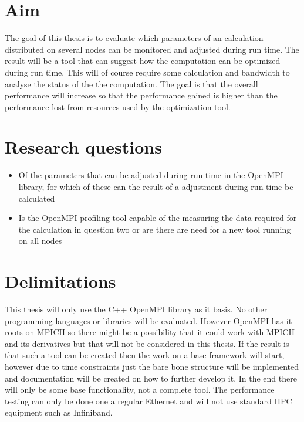 \documentclass[thesis.tex]{subfiles}
\begin{document}
\section{Aim}
The goal of this thesis is to evaluate which parameters of an calculation distributed on several nodes can be monitored and adjusted during run time. The result will be a tool that can suggest how the computation can be optimized during run time. This will of course require some calculation and bandwidth to analyse the status of the the computation. The goal is that the overall performance will increase so that the performance gained is higher than the performance lost from resources used by the optimization tool.

\section{Research questions}
\begin{itemize}
\item Of the parameters that can be adjusted during run time in the OpenMPI library, for which of these can the result of a adjustment during run time be calculated
\item Is the OpenMPI profiling tool capable of the measuring the data required for the calculation in question two or are there are need for a new tool running on all nodes
\end{itemize}

\section{Delimitations}
This thesis will only use the C++ OpenMPI library as it basis. No other programming languages or libraries will be evaluated. However OpenMPI has it roots on MPICH so there might be a possibility that it could work with MPICH and its derivatives but that will not be considered in this thesis. If the result is that such a tool can be created then the work on a base framework will start, however due to time constraints just the bare bone structure will be implemented and documentation will be created on how to further develop it. In the end there will only be some base functionality, not a complete tool. 
\newline
\newline
The performance testing can only be done one a regular Ethernet and will not use standard HPC equipment such as Infiniband. 
\end{document}

